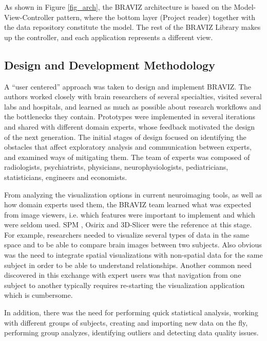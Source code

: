 \documentclass{frontiersHLTH}
\begin{document}
As shown in Figure \ref{fig_arch}, the BRAVIZ architecture is based on the Model-View-Controller pattern, where the bottom layer (Project reader) together with the data repository constitute the model. The rest of the BRAVIZ Library makes up the controller, and each application represents a different view.

\subsection{Design and Development Methodology}

A ``user centered'' approach \cite{wassink_applying_2009} was taken to design and implement BRAVIZ. The authors worked closely with brain researchers of several specialties, visited several labs and hospitals, and learned as much as possible about research workflows and the bottlenecks they contain. Prototypes were implemented in several iterations and shared with different domain experts, whose feedback motivated the design of the next generation.
The initial stages of design focused on identifying the obstacles that affect exploratory analysis and communication between experts, and examined ways of mitigating them. The team of experts was composed of radiologists, psychiatrists, physicians, neurophysiologists, pediatricians, statisticians, engineers and economists.

From analyzing the visualization options in current neuroimaging tools, as well as how domain experts used them, the BRAVIZ team learned what was expected from image viewers, i.e. which features were important to implement and which were seldom used. SPM \cite{friston_statistical_2007}, Osirix \cite{rosset_osirix:_2004} and 3D-Slicer \cite{fedorov_3d_2012} were the reference at this stage. For example, researchers needed to visualize several types of data in the same space and to be able to compare brain images between two subjects. Also obvious was the need to integrate spatial visualizations with non-spatial data for the same subject in order to be able to understand relationships. Another common need discovered in this exchange with expert users was that navigation from one subject to another typically requires re-starting the visualization application which is cumbersome. 

In addition, there was the need for performing quick statistical analysis, working with different groups of subjects, creating and importing new data on the fly, performing group analyzes, identifying outliers and detecting data quality issues. 
\end{document}

